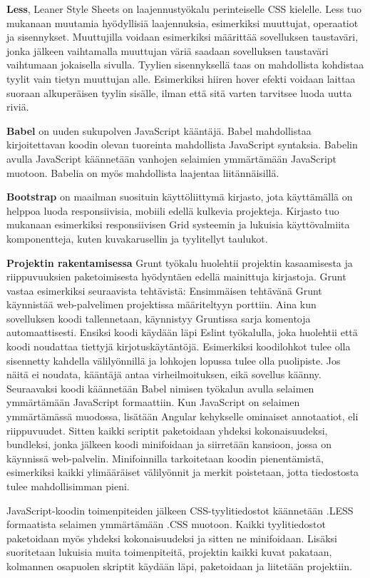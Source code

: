 \documentclass{tktltiki}
\begin{document}
\textbf{Less}, Leaner Style Sheets on laajennustyökalu perinteiselle CSS kielelle. Less tuo mukanaan muutamia hyödyllisiä laajennuksia, esimerkiksi muuttujat, operaatiot ja sisennykset. Muuttujilla voidaan esimerkiksi määrittää sovelluksen taustaväri, jonka jälkeen vaihtamalla muuttujan väriä saadaan sovelluksen taustaväri vaihtumaan jokaisella sivulla. Tyylien sisennyksellä taas on mahdollista kohdistaa tyylit vain tietyn muuttujan alle. Esimerkiksi hiiren hover efekti voidaan laittaa suoraan alkuperäisen tyylin sisälle, ilman että sitä varten tarvitsee luoda uutta riviä.

\textbf{Babel} on uuden sukupolven JavaScript kääntäjä. Babel mahdollistaa kirjoitettavan koodin olevan tuoreinta mahdollista JavaScript syntaksia. Babelin avulla JavaScript käännetään vanhojen selaimien ymmärtämään JavaScript muotoon. Babelia on myös mahdollista laajentaa liitännäisillä.

\textbf{Bootstrap} on maailman suosituin käyttöliittymä kirjasto, jota käyttämällä on helppoa luoda responsiivisia, mobiili edellä kulkevia projekteja. Kirjasto tuo mukanaan esimerkiksi responsiivisen Grid systeemin ja lukuisia käyttövalmiita komponentteja, kuten kuvakarusellin ja tyylitellyt taulukot. 

\textbf{Projektin rakentamisessa} Grunt työkalu huolehtii projektin kasaamisesta ja riippuvuuksien paketoimisesta hyödyntäen edellä mainittuja kirjastoja. Grunt vastaa esimerkiksi seuraavista tehtävistä: Ensimmäisen tehtävänä Grunt käynnistää web-palvelimen projektissa määriteltyyn porttiin. Aina kun sovelluksen koodi tallennetaan, käynnistyy Gruntissa sarja komentoja automaattisesti. Ensiksi koodi käydään läpi Eslint työkalulla, joka huolehtii että koodi noudattaa tiettyjä kirjotuskäytäntöjä. Esimerkiksi koodilohkot tulee olla sisennetty kahdella välilyönnillä ja lohkojen lopussa tulee olla puolipiste. Jos näitä ei noudata, kääntäjä antaa virheilmoituksen, eikä sovellus käänny. Seuraavaksi koodi käännetään Babel nimisen työkalun avulla selaimen ymmärtämään JavaScript formaattiin. Kun JavaScript on selaimen ymmärtämässä muodossa, lisätään Angular kehykselle ominaiset annotaatiot, eli riippuvuudet. Sitten kaikki scriptit paketoidaan yhdeksi kokonaisuudeksi, bundleksi, jonka jälkeen koodi minifoidaan ja siirretään kansioon, jossa on käynnissä web-palvelin. Minifoinnilla tarkoitetaan koodin pienentämistä, esimerkiksi kaikki ylimääräiset välilyönnit ja merkit poistetaan, jotta tiedostosta tulee mahdollisimman pieni.

JavaScript-koodin toimenpiteiden jälkeen CSS-tyylitiedostot käännetään .LESS formaatista selaimen ymmärtämään .CSS muotoon. Kaikki tyylitiedostot paketoidaan myös yhdeksi kokonaisuudeksi ja sitten ne minifoidaan. Lisäksi suoritetaan lukuisia muita toimenpiteitä, projektin kaikki kuvat pakataan, kolmannen osapuolen skriptit käydään läpi, paketoidaan ja liitetään projektiin.
\end{document}
